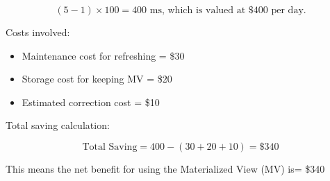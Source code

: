 \[
(5 - 1) \times 100 = 400 \text{ ms, which is valued at } \$400 \text{ per day.}
\]

Costs involved:
\begin{itemize}
    \item Maintenance cost for refreshing = \$30
    \item Storage cost for keeping MV = \$20
    \item Estimated correction cost = \$10
\end{itemize}

Total saving calculation:

\[
\text{Total Saving} = 400 - (30 + 20 + 10) = \$340
\]

This means the net benefit for using the Materialized View (MV) is= \$340